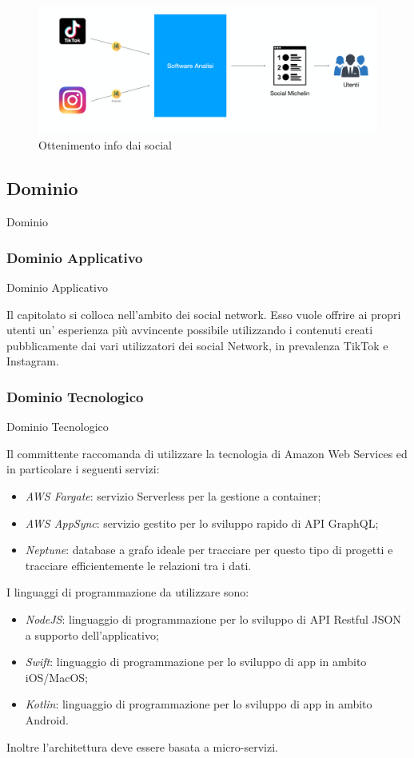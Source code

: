 \documentclass[11pt]{article}
\begin{document}
    \begin{figure}[h!]
        \centering
        \includegraphics[scale=0.4]{Res/C4.PNG}
        \caption{Ottenimento info dai social}
        \label{GuidaMIchelin}
    \end{figure}
    
    \subsection{Dominio} Dominio
        \subsubsection{Dominio Applicativo} Dominio Applicativo
        
        Il capitolato si colloca nell'ambito dei social network.
        Esso vuole offrire ai propri utenti un' esperienza più avvincente possibile utilizzando i contenuti creati pubblicamente dai vari utilizzatori dei social Network, in prevalenza TikTok e Instagram.
        \subsubsection{Dominio Tecnologico} Dominio Tecnologico
        
        Il committente raccomanda di utilizzare la tecnologia di Amazon Web Services ed in particolare i seguenti servizi:
		\begin{itemize}
			\item \textit{AWS Fargate}: servizio Serverless per la gestione a container;
			\item \textit{AWS AppSync}: servizio gestito per lo sviluppo rapido di API GraphQL;
			\item \textit{Neptune}: database a grafo ideale per tracciare per questo tipo di progetti e tracciare efficientemente le relazioni tra i dati.
		\end{itemize}
		I linguaggi di programmazione da utilizzare sono:
		\begin{itemize}
			\item \textit{NodeJS}: linguaggio di programmazione per lo sviluppo di API Restful JSON a supporto dell’applicativo;
			\item \textit{Swift}: linguaggio di programmazione per lo sviluppo di app in ambito iOS/MacOS;
			\item \textit{Kotlin}: linguaggio di programmazione per lo sviluppo di app in ambito Android.
		\end{itemize}
		Inoltre l’architettura deve essere basata a micro-servizi.
    
\end{document}
